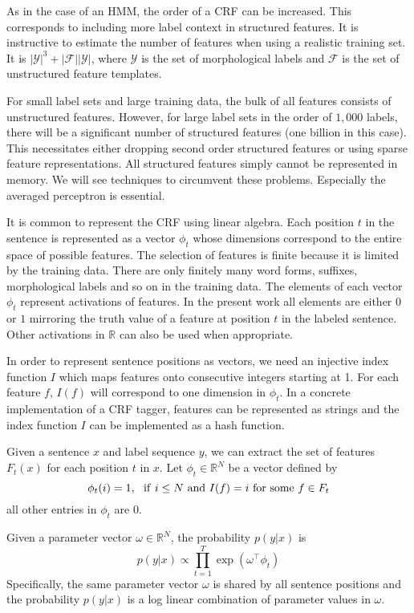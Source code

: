 As in the case of an HMM, the order of a CRF can be increased. This
corresponds to including more label context in structured features. It
is instructive to estimate the number of features when using a
realistic training set. It is
$|\mathcal{Y}|^3 + |\mathcal{F}||\mathcal{Y}|$, where $\mathcal{Y}$ is
the set of morphological labels and $\mathcal{F}$ is the set of
unstructured feature templates.

For small label sets and large training data, the bulk of all features
consists of unstructured features. However, for large
label sets in the order of $1,000$ labels, there will be a significant
number of structured features (one billion in this case). This
necessitates either dropping second order structured features or using
sparse feature representations. All structured features simply cannot
be represented in memory. We will see techniques to circumvent these
problems. Especially the averaged perceptron is essential.

It is common to represent the CRF using linear algebra. Each position
$t$ in the sentence is represented as a vector $\phi_t$ whose
dimensions correspond to the entire space of possible features. The
selection of features is finite because it is limited by the training
data. There are only finitely many word forms, suffixes, morphological
labels and so on in the training data. The elements of each vector
$\phi_t$ represent activations of features. In the present work all
elements are either $0$ or $1$ mirroring the truth value of a feature
at position $t$ in the labeled sentence. Other activations in
$\mathbb{R}$ can also be used when appropriate.

In order to represent sentence positions as vectors, we need an
injective index function $I$ which maps features onto consecutive
integers starting at 1. For each feature $f$, $I(f)$ will correspond
to one dimension in $\phi_t$. In a concrete implementation of a CRF
tagger, features can be represented as strings and the index function
$I$ can be implemented as a hash function.
 
Given a sentence $x$ and label sequence $y$, we can extract the set of features
$F_t(x)$ for each position $t$ in $x$. Let $\phi_t \in \mathbb{R}^N$ be a vector defined by
$$\phi_t(i) = 1,\ {\rm\ if}\ i \le N\ {\rm and}\ I(f) = i\ {\rm for\ some\ }f\in F_t$$
all other entries in $\phi_t$ are $0$. 

Given a parameter vector $\omega \in \mathbb{R}^N$, the probability $p(y|x)$ is
$$p(y|x) \propto \prod_{t = 1}^T \exp(\omega^\top \phi_t)$$
Specifically, the same parameter vector $\omega$ is shared by all
sentence positions and the probability $p(y|x)$ is a log linear
combination of parameter values in $\omega$.

